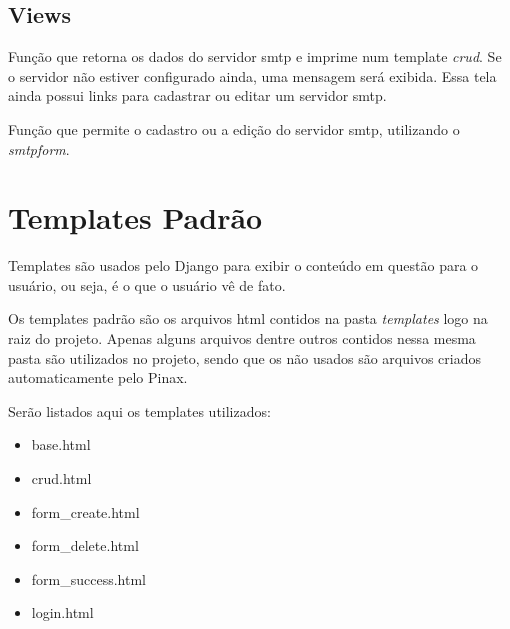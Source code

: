 \documentclass[letterpaper,10pt,brazil]{sphinxmanual}
\begin{document}
\subsection{Views}
\label{apps/smtp:module-smtp.views}\label{apps/smtp:views}

\begin{fulllineitems}
\label{apps/smtp:smtp.views.index}
Função que retorna os dados do servidor smtp e imprime num template \emph{crud}. Se o servidor não estiver configurado ainda, uma mensagem será exibida. Essa tela ainda possui links para cadastrar ou editar um servidor smtp.

\end{fulllineitems}


\begin{fulllineitems}
\label{apps/smtp:smtp.views.configure}
Função que permite o cadastro ou a edição do servidor smtp, utilizando o \emph{smtpform}.

\end{fulllineitems}



\section{Templates Padrão}
\label{templates:templates-padrao}\label{templates::doc}
Templates são usados pelo Django para exibir o conteúdo em questão para o usuário, ou seja, é o que o usuário vê de fato.

Os templates padrão são os arquivos html contidos na pasta \emph{templates} logo na raiz do projeto. Apenas alguns arquivos dentre outros contidos nessa mesma pasta são utilizados no projeto, sendo que os não usados são arquivos criados automaticamente pelo Pinax.

Serão listados aqui os templates utilizados:
\begin{itemize}
\item {} 
base.html

\item {} 
crud.html

\item {} 
form\_create.html

\item {} 
form\_delete.html

\item {} 
form\_success.html

\item {} 
login.html

\end{itemize}
\end{document}
